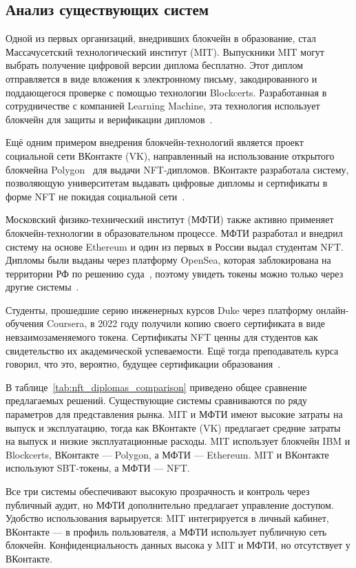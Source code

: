 \subsection{Анализ существующих систем}

Одной из первых организаций, внедривших блокчейн в образование, стал Массачусетский технологический институт (MIT). Выпускники MIT могут выбрать получение цифровой версии диплома бесплатно. Этот диплом отправляется в виде вложения к электронному письму, закодированного и поддающегося проверке с помощью технологии Blockcerts. Разработанная в сотрудничестве с компанией Learning Machine, эта технология использует блокчейн для защиты и верификации дипломов~\cite{bib:mit_diplomas}.

Ещё одним примером внедрения блокчейн-технологий является проект социальной сети ВКонтакте (VK), направленный на использование открытого блокчейна Polygon~\cite{bib:polygon} для выдачи NFT-дипломов. ВКонтакте разработала систему, позволяющую университетам выдавать цифровые дипломы и сертификаты в форме NFT не покидая социальной сети~\cite{bib:vk_nft_diploma}.

Московский физико-технический институт (МФТИ) также активно применяет блокчейн-технологии в образовательном процессе. МФТИ разработал и внедрил систему на основе Ethereum и один из первых в России выдал студентам NFT. Дипломы были выданы через платформу OpenSea, которая заблокирована на территории РФ по решению суда~\cite{bib:opensea_block}, поэтому увидеть токены можно только через другие системы~\cite{bib:mipt_nft_diploma}.

Студенты, прошедшие серию инженерных курсов Duke через платформу онлайн-обучения Coursera, в 2022 году получили копию своего сертификата в виде невзаимозаменяемого токена. Сертификаты NFT ценны для студентов как свидетельство их академической успеваемости. Ещё тогда преподаватель курса говорил, что это, вероятно, будущее сертификации образования~\cite{bib:duke_nft_diploma}.

В таблице~\ref{tab:nft_diplomas_comparison} приведено общее сравнение предлагаемых решений. Существующие системы сравниваются по ряду параметров для представления рынка. MIT и МФТИ имеют высокие затраты на выпуск и эксплуатацию, тогда как ВКонтакте (VK) предлагает средние затраты на выпуск и низкие эксплуатационные расходы. MIT использует блокчейн IBM и Blockcerts, ВКонтакте — Polygon, а МФТИ — Ethereum. MIT и ВКонтакте используют SBT-токены, а МФТИ — NFT.

Все три системы обеспечивают высокую прозрачность и контроль через публичный аудит, но МФТИ дополнительно предлагает управление доступом. Удобство использования варьируется: MIT интегрируется в личный кабинет, ВКонтакте — в профиль пользователя, а МФТИ использует публичную сеть блокчейн. Конфиденциальность данных высока у MIT и МФТИ, но отсутствует у ВКонтакте.

